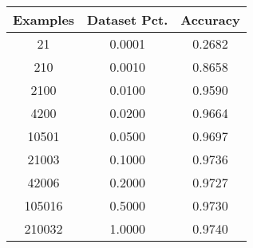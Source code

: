 \begin{tabular}{ccc}
\toprule
Examples & Dataset Pct. & Accuracy \\
\midrule
21 & 0.0001 & 0.2682 \\
210 & 0.0010 & 0.8658 \\
2100 & 0.0100 & 0.9590 \\
4200 & 0.0200 & 0.9664 \\
10501 & 0.0500 & 0.9697 \\
21003 & 0.1000 & 0.9736 \\
42006 & 0.2000 & 0.9727 \\
105016 & 0.5000 & 0.9730 \\
210032 & 1.0000 & 0.9740 \\
\bottomrule
\end{tabular}
